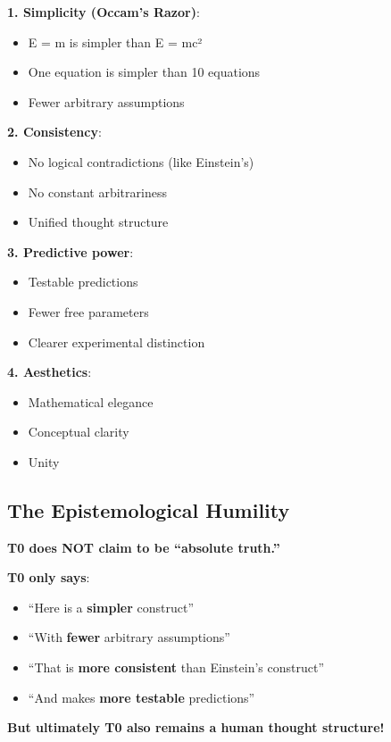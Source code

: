 	\textbf{1. Simplicity (Occam's Razor)}:
	\begin{itemize}
		\item E = m is simpler than E = mc²
		\item One equation is simpler than 10 equations
		\item Fewer arbitrary assumptions
	\end{itemize}
	
	\textbf{2. Consistency}:
	\begin{itemize}
		\item No logical contradictions (like Einstein's)
		\item No constant arbitrariness
		\item Unified thought structure
	\end{itemize}
	
	\textbf{3. Predictive power}:
	\begin{itemize}
		\item Testable predictions
		\item Fewer free parameters
		\item Clearer experimental distinction
	\end{itemize}
	
	\textbf{4. Aesthetics}:
	\begin{itemize}
		\item Mathematical elegance
		\item Conceptual clarity
		\item Unity
	\end{itemize}
	
	\subsection{The Epistemological Humility}
	
	\textbf{T0 does NOT claim to be ``absolute truth.''}
	
	\textbf{T0 only says}:
	\begin{itemize}
		\item ``Here is a \textbf{simpler} construct''
		\item ``With \textbf{fewer} arbitrary assumptions''
		\item ``That is \textbf{more consistent} than Einstein's construct''
		\item ``And makes \textbf{more testable} predictions''
	\end{itemize}
	
	\textbf{But ultimately T0 also remains a human thought structure!}
	
